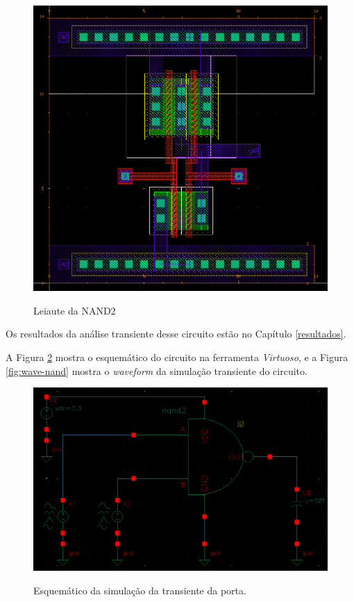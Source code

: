 \documentclass{iiufrgs}
\newcommand{\virtuoso}{\textit{Virtuoso}}
\begin{document}
\begin{figure}[htbp]
    \centering
    \caption{Leiaute da NAND2}
    \includegraphics[scale=0.7]{images/layout_nand.png}
    \label{fig:leiaute-nand}
\end{figure}

\FloatBarrier

Os resultados da análise transiente desse circuito estão no Capítulo \ref{resultados}.\

A Figura \ref{fig:trans-nand} mostra o esquemático do circuito na ferramenta \virtuoso, e a Figura \ref{fig:wave-nand} mostra o \textit{waveform} da simulação transiente do circuito.\

\begin{figure}[htbp]
    \centering
    \caption{Esquemático da simulação da transiente da porta.}
    \includegraphics[scale=0.45]{images/schem_trans_nand.png}
    \label{fig:trans-nand}
\end{figure}
\end{document}
